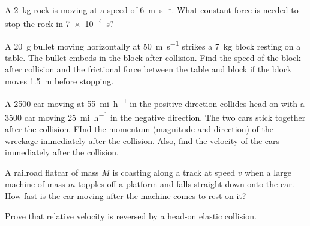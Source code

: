 \documentclass [hw]{exam}
\begin{document}
\begin{questions}
\question A \SI{2}{\kilo\gram} rock is moving at a speed of \SI{6}{\meter\per\second}. What constant force is needed to stop the rock in \SI{7e-4}{\second}?

\question A \SI{20}{\gram} bullet moving horizontally at \SI{50}{\meter\per\second} strikes a \SI{7}{\kilo\gram} block resting on a table. The bullet embeds in the block after collision. Find the speed of the block after collision and the frictional force between the table and block if the block moves \SI{1.5}{\meter} before stopping.

\question A \SI{2500}{\pound} car moving at \SI{55}{mi\per\hour} in the positive direction collides head-on with a  \SI{3500}{\pound} car moving \SI{25}{mi\per\hour} in the negative direction. The two cars stick together after the collision. FInd the momentum (magnitude and direction) of the wreckage immediately after the collision. Also, find the velocity of the cars immediately after the collision.

\question A railroad flatcar of mass $M$ is coasting along a track at speed $v$ when a large machine of mass $m$ topples off a platform and falls straight down onto the car. How fast is the car moving after the machine comes to rest on it? 

\question Prove that relative velocity is reversed by a head-on elastic collision. 
 
\end{questions}
\end{document}
